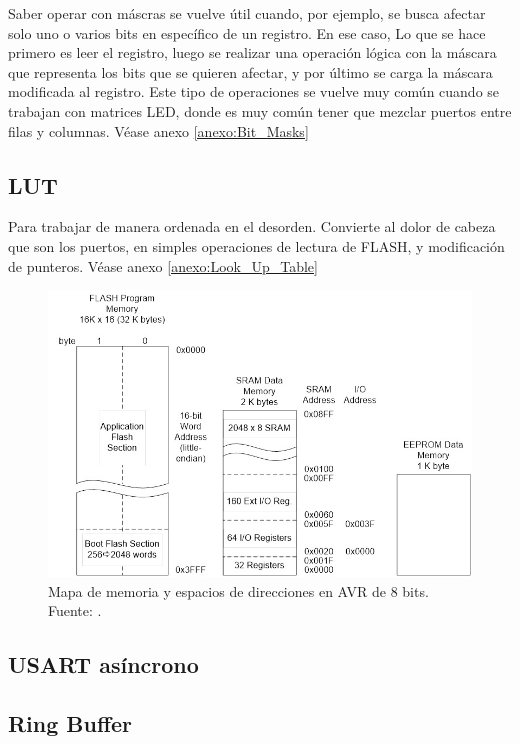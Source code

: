 Saber operar con máscras se vuelve útil cuando, por ejemplo, se busca afectar solo uno o varios bits en específico de un registro. En ese caso,  Lo que se hace primero es leer el registro, luego se realizar una operación lógica con la máscara que representa los bits que se quieren afectar, y por último se carga la máscara modificada al registro. Este tipo de operaciones se vuelve muy común cuando se trabajan con matrices LED, donde es muy común tener que mezclar puertos entre filas y columnas. Véase anexo \ref{anexo:Bit_Masks}


\subsection{LUT}
Para trabajar de manera ordenada en el desorden. Convierte al dolor de cabeza que son los puertos, en simples operaciones de lectura de FLASH, y modificación de punteros. Véase anexo \ref{anexo:Look_Up_Table}

\begin{figure}[H]
  \centering
  \includegraphics[width=\linewidth]{./Anexos/Memory Map.jpg}
  \caption{Mapa de memoria y espacios de direcciones en AVR de 8 bits. Fuente: \cite{arxterra_avr_addressing_modes}.}
  \label{fig:avr-memory-map}
\end{figure}

\subsection{USART asíncrono}

\subsection{Ring Buffer}

